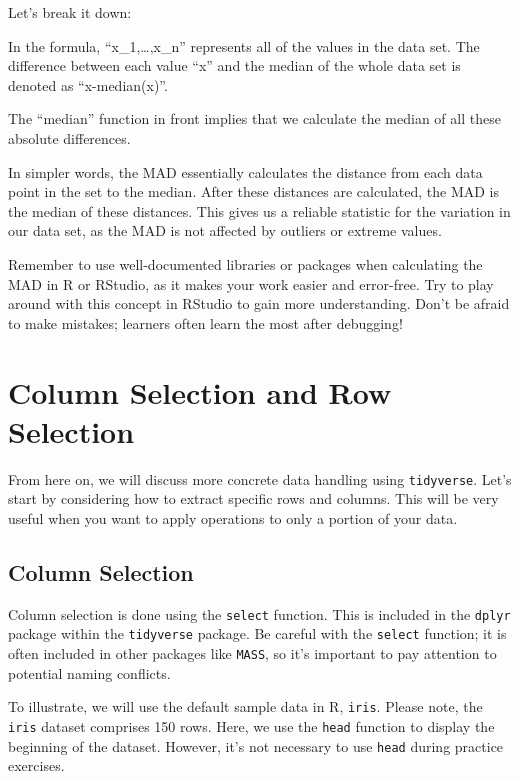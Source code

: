 \documentclass[
  a4paper,
]{book}
\begin{document}
Let's break it down:

In the formula, ``x\_1,\ldots,x\_n'' represents all of the values in the
data set. The difference between each value ``x'' and the median of the
whole data set is denoted as ``\textbar x-median(x)\textbar{}''.

The ``median'' function in front implies that we calculate the median of
all these absolute differences.

In simpler words, the MAD essentially calculates the distance from each
data point in the set to the median. After these distances are
calculated, the MAD is the median of these distances. This gives us a
reliable statistic for the variation in our data set, as the MAD is not
affected by outliers or extreme values.

Remember to use well-documented libraries or packages when calculating
the MAD in R or RStudio, as it makes your work easier and error-free.
Try to play around with this concept in RStudio to gain more
understanding. Don't be afraid to make mistakes; learners often learn
the most after debugging!

\section{Column Selection and Row
Selection}\label{column-selection-and-row-selection}

From here on, we will discuss more concrete data handling using
\texttt{tidyverse}. Let's start by considering how to extract specific
rows and columns. This will be very useful when you want to apply
operations to only a portion of your data.

\subsection{Column Selection}\label{column-selection}

Column selection is done using the \texttt{select} function. This is
included in the \texttt{dplyr} package within the \texttt{tidyverse}
package. Be careful with the \texttt{select} function; it is often
included in other packages like \texttt{MASS}, so it's important to pay
attention to potential naming conflicts.

To illustrate, we will use the default sample data in R, \texttt{iris}.
Please note, the \texttt{iris} dataset comprises 150 rows. Here, we use
the \texttt{head} function to display the beginning of the dataset.
However, it's not necessary to use \texttt{head} during practice
exercises.
\end{document}
